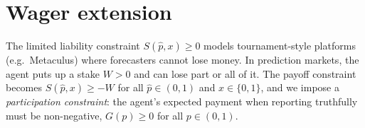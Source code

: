 \documentclass[11pt]{article}
\begin{document}

\newpage

\section{Wager extension}\label{sec:wager}

The limited liability constraint $S(\hat{p}, x) \geq 0$ models tournament-style platforms (e.g.\ Metaculus) where forecasters cannot lose money. In prediction markets, the agent puts up a stake $W > 0$ and can lose part or all of it. The payoff constraint becomes $S(\hat{p}, x) \geq -W$ for all $\hat{p} \in (0,1)$ and $x \in \{0,1\}$, and we impose a \emph{participation constraint}: the agent's expected payment when reporting truthfully must be non-negative, $G(p) \geq 0$ for all $p \in (0,1)$.
\end{document}
